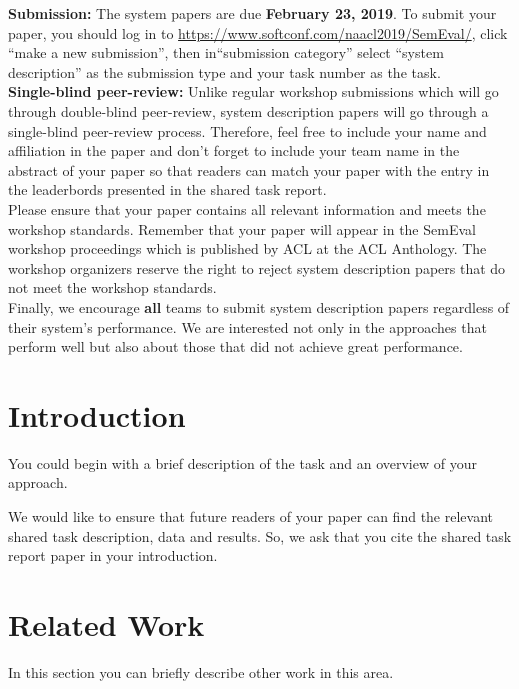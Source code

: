 \documentclass[11pt,a4paper]{article}
\begin{document}
{\bf Submission:} The system papers are due {\bf February 23, 2019}. To submit your paper, you should log in to \url{https://www.softconf.com/naacl2019/SemEval/}, click ``make a new submission'', then in``submission category'' select ``system description'' as the submission type and your task number as the task.
\\

{\bf Single-blind peer-review:} Unlike regular workshop submissions which will go through double-blind peer-review, system description papers will go through a single-blind peer-review process. Therefore, feel free to include your name and affiliation in the paper and don't forget to include your team name in the abstract of your paper so that readers can match your paper with the entry in the leaderbords presented in the shared task report.\\

Please ensure that your paper contains all relevant information and meets the workshop standards. Remember that your paper will appear in the SemEval workshop proceedings which is published by ACL at the ACL Anthology. The workshop organizers reserve the right to reject system description papers that do not meet the workshop standards.\\

Finally, we encourage {\bf all} teams to submit system description papers regardless of their system's performance. We are interested not only in the approaches that perform well but also about those that did not achieve great performance.\\

\section{Introduction}
\label{intro}

You could begin with a brief description of the task and an overview of your approach. 

We would like to ensure that future readers of your paper can find the relevant shared task description, data and results. So, we ask that you cite the shared task report paper \cite{offenseval} in your introduction.
\\

\section{Related Work}

In this section you can briefly describe other work in this area.
\\
\end{document}
